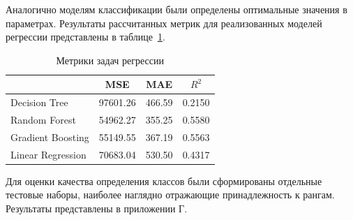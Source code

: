 Аналогично моделям классификации были определены оптимальные значения в параметрах. Результаты рассчитанных метрик для реализованных моделей регрессии представлены в таблице~\ref{tabular:table-regression}.

\begin{table}[H]
    \onehalfspacing \caption{Метрики задач регрессии}
    \medskip
        \begin{tabular}{|l|c|c|c|}
        \hline
            \backslashbox{}{}  & MSE & MAE & $R^2$ \\ \hline
            Decision Tree & 97601.26 & 466.59 & 0.2150 \\  \hline 
            Random Forest & 54962.27 & 355.25 & 0.5580 \\  \hline 
            Gradient Boosting & 55149.55 & 367.19 & 0.5563 \\  \hline 
            Linear Regression & 70683.04 & 530.50 &  0.4317 \\  \hline 
        \end{tabular}
    \label{tabular:table-regression}
\end{table}

Для оценки качества определения классов были сформированы отдельные тестовые наборы, наиболее наглядно отражающие принадлежность к рангам. Результаты представлены в приложении Г.